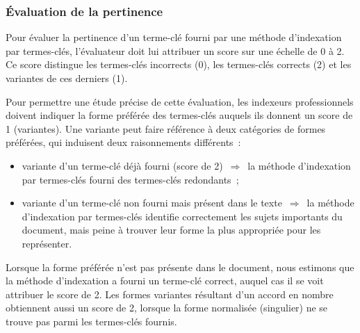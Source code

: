       \subsubsection{Évaluation de la pertinence}
      \label{subsubsec:main-automatic_evaluation_of_keyphrase_annotation-methodology-evaluation_protocol-relevancy}
        Pour évaluer la pertinence d'un terme-clé fourni par une méthode
        d'indexation par termes-clés, l'évaluateur doit lui attribuer un score
        sur une échelle de 0 à 2. Ce score distingue les termes-clés incorrects
        (0), les termes-clés corrects (2) et les variantes de ces derniers (1).

        Pour permettre une étude précise de cette évaluation, les indexeurs
        professionnels doivent indiquer la forme préférée des termes-clés
        auquels ils donnent un score de 1 (variantes). Une variante peut faire
        référence à deux catégories de formes préférées, qui induisent deux
        raisonnements différents~:
        \begin{itemize}
          \item{variante d'un terme-clé déjà fourni (score de
                2)~$\Rightarrow$~la méthode d'indexation par termes-clés fourni
                des termes-clés redondants~;}
          \item{variante d'un terme-clé non fourni mais présent dans le
              texte~$\Rightarrow$~la méthode d'indexation par termes-clés
                identifie correctement les sujets importants du document, mais
                peine à trouver leur forme la plus appropriée pour les
                représenter.}
        \end{itemize}

        Lorsque la forme préférée n'est pas présente dans le document, nous
        estimons que la méthode d'indexation a fourni un terme-clé correct,
        auquel cas il se voit attribuer le score de 2. Les formes variantes
        résultant d'un accord en nombre obtiennent aussi un score de 2, lorsque
        la forme normalisée (singulier) ne se trouve pas parmi les termes-clés
        fournis.




